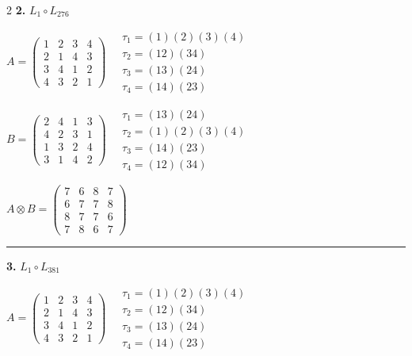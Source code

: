 \begin{multicols}{2}
\noindent\textbf{2.} $L_{1} \circ L_{276}$

$A = \begin{pmatrix} 1 & 2 & 3 & 4 \\ 2 & 1 & 4 & 3 \\ 3 & 4 & 1 & 2 \\ 4 & 3 & 2 & 1 \end{pmatrix} \quad \begin{matrix} \tau_{1}=(1)(2)(3)(4) \\ \tau_{2}=(1 2)(3 4) \\ \tau_{3}=(1 3)(2 4) \\ \tau_{4}=(1 4)(2 3) \end{matrix}$

$B = \begin{pmatrix} 2 & 4 & 1 & 3 \\ 4 & 2 & 3 & 1 \\ 1 & 3 & 2 & 4 \\ 3 & 1 & 4 & 2 \end{pmatrix} \quad \begin{matrix} \tau_{1}=(1 3)(2 4) \\ \tau_{2}=(1)(2)(3)(4) \\ \tau_{3}=(1 4)(2 3) \\ \tau_{4}=(1 2)(3 4) \end{matrix}$

$A \otimes B = \begin{pmatrix} 7 & 6 & 8 & 7 \\ 6 & 7 & 7 & 8 \\ 8 & 7 & 7 & 6 \\ 7 & 8 & 6 & 7 \end{pmatrix}$

\vspace{0.3em}
\hrule
\vspace{0.3em}

\noindent\textbf{3.} $L_{1} \circ L_{381}$

$A = \begin{pmatrix} 1 & 2 & 3 & 4 \\ 2 & 1 & 4 & 3 \\ 3 & 4 & 1 & 2 \\ 4 & 3 & 2 & 1 \end{pmatrix} \quad \begin{matrix} \tau_{1}=(1)(2)(3)(4) \\ \tau_{2}=(1 2)(3 4) \\ \tau_{3}=(1 3)(2 4) \\ \tau_{4}=(1 4)(2 3) \end{matrix}$


\end{multicols}
